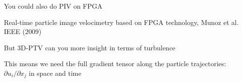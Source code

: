     
%    

%

\begin{frame}[label=app-20]{You could also do PIV on FPGA}
    \begin{cardTiny}
    Real-time particle image velocimetry based on FPGA technology, Munoz et al. IEEE (2009)
    \end{cardTiny}
\end{frame}

    
\begin{frame}[label=app-17a]{But 3D-PTV can you more insight in terms of turbulence}
    \begin{cardTiny} 
    This means we need  the \alert{full gradient tensor} along the particle trajectories:
    $\partial u_{i}/\partial x_{j}$ in space and time
    \end{cardTiny}
    \begin{multicols}{2}
    \centering
    \end{multicols}
\end{frame}
